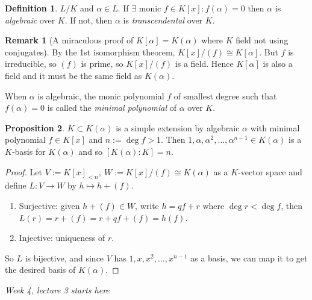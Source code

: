 \documentclass[a4paper]{article}
\theoremstyle{definition}
\newtheorem{defn}{Definition}[subsection]
\newtheorem{prop}[defn]{Proposition}
\newtheorem*{remark}{Remark}
\begin{document}
\begin{defn}
$L/K$ and $\alpha\in L$. If $\exists$ monic $f\in K[x]:f(\alpha)=0$ then $\alpha$ is \textit{algebraic} over $K$. If not, then $\alpha$ is \textit{transcendental} over $K$.

\begin{remark}[A miraculous proof of $K{[\alpha]}=K(\alpha)$ where $K$ field not using conjugates]
By the 1st isomorphism theorem, $K[x]/(f)\cong K[\alpha]$. But $f$ is irreducible, so $(f)$ is prime, so $K[x]/(f)$ is a field. Hence $K[\alpha]$ is also a field and it must be the same field as $K(\alpha)$.
\end{remark}

When $\alpha$ is algebraic, the monic polynomial $f$ of smallest degree such that $f(\alpha)=0$ is called the \textit{minimal polynomial} of $\alpha$ over $K.$
\end{defn}

\begin{prop}
\label{prop:basisofsimpleext}
$K\subset K(\alpha)$ is a simple extension by algebraic $\alpha$ with minimal polynomial $f\in K[x]$ and $n:=\deg f>1$. Then $1,\alpha,\alpha^2,\ldots,\alpha^{n-1}\in K(\alpha)$ is a $K$-basis for $K(\alpha)$ and so $[K(\alpha):K]=n$.
\end{prop}
\begin{proof}
Let $V:=K[x]_{<n},\ W:=K[x]/(f)\cong K(\alpha)$ as a $K$-vector space and define $L:V\rightarrow W$ by $h\mapsto h+(f)$.
\begin{enumerate}
\item Surjective: given $h+(f)\in W$, write $h=qf+r$ where $\deg r<\deg f$, then $L(r)=r+(f)=r+qf+(f)=h(f)$.
\item Injective: uniqueness of $r$.
\end{enumerate}
So $L$ is bijective, and since $V$ has $1,x,x^2,\ldots,x^{n-1}$ as a basis, we can map it to get the desired basis of $K(\alpha)$.
\end{proof}

\begin{flushright}
\textit{Week 4, lecture 3 starts here}
\end{flushright}
\end{document}
